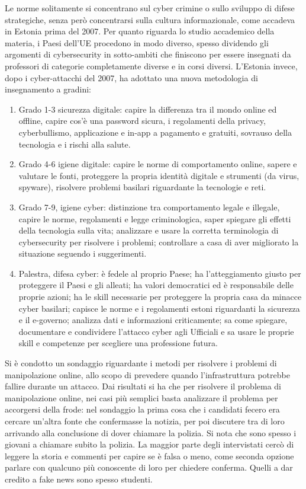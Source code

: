\documentclass[a4page, 11pt, twocolumn]{article}
\begin{document}
Le norme solitamente si concentrano sul cyber crimine o sullo sviluppo di difese strategiche, senza però concentrarsi sulla cultura informazionale, come accadeva in Estonia prima del 2007.
Per quanto riguarda lo studio accademico della materia, i Paesi dell'UE procedono in modo diverso, spesso dividendo gli argomenti di cybersecurity in sotto-ambiti che finiscono per essere insegnati da professori di categorie completamente diverse e in corsi diversi.
L'Estonia invece, dopo i cyber-attacchi del 2007, ha adottato una nuova metodologia di insegnamento a gradini:
\begin{enumerate}
  \item Grado 1-3 sicurezza digitale: capire la differenza tra il mondo online ed offline, capire cos'è una password sicura, i regolamenti della privacy, cyberbullismo, applicazione e in-app a pagamento e gratuiti, sovrauso della tecnologia e i rischi alla salute.
  \item	Grado 4-6 igiene digitale: capire le norme di comportamento online, sapere e valutare le fonti, proteggere la propria identità digitale e strumenti (da virus, spyware), risolvere problemi basilari riguardante la tecnologie e reti.
  \item Grado 7-9, igiene cyber: distinzione tra comportamento legale e illegale, capire le norme, regolamenti e legge criminologica, saper spiegare gli effetti della tecnologia sulla vita; analizzare e usare la corretta terminologia di cybersecurity per risolvere i problemi; controllare a casa di aver migliorato la situazione seguendo i suggerimenti.
  \item Palestra, difesa cyber: è fedele al proprio Paese; ha l'atteggiamento giusto per proteggere il Paesi e gli alleati; ha valori democratici ed è responsabile delle proprie azioni; ha le skill necessarie per proteggere la propria casa da minacce cyber basilari; capisce le norme e i regolamenti estoni riguardanti la sicurezza e il e-governo; analizza dati e informazioni criticamente; sa come spiegare, documentare e condividere l'attacco cyber agli Ufficiali e sa usare le	proprie skill e competenze per scegliere una professione futura.
\end{enumerate}

Si è condotto un sondaggio riguardante i metodi per risolvere i problemi di manipolazione online, allo scopo di prevedere quando l'infrastruttura potrebbe fallire durante un attacco.
Dai risultati si ha che per risolvere il problema di manipolazione online, nei casi più semplici basta analizzare il problema per accorgersi della frode: nel sondaggio la prima cosa che i candidati fecero era cercare un'altra fonte che confermasse la notizia, per poi discutere tra di loro arrivando alla conclusione di dover chiamare la polizia.
Si nota che sono spesso i giovani a chiamare subito la polizia.
La maggior parte degli intervistati cercò di leggere la storia e commenti per capire se è falsa o meno, come seconda opzione parlare con qualcuno più conoscente di loro
per chiedere conferma.
Quelli a dar credito a fake news sono spesso studenti.
\end{document}
